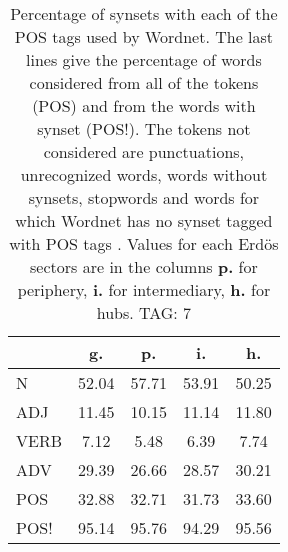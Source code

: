 \begin{table}[h!]
\begin{center}
\begin{tabular}{| l | c | c | c | c |}\hline
 & g. & p. & i. & h. \\\hline
N & 52.04  & 57.71  & 53.91  & 50.25 \\\hline
ADJ & 11.45  & 10.15  & 11.14  & 11.80 \\\hline
VERB & 7.12  & 5.48  & 6.39  & 7.74 \\\hline
ADV & 29.39  & 26.66  & 28.57  & 30.21 \\\hline
POS & 32.88  & 32.71  & 31.73  & 33.60 \\\hline
POS! & 95.14  & 95.76  & 94.29  & 95.56 \\\hline
\end{tabular}
\caption{Percentage of synsets with each of the POS tags used by Wordnet. The last lines give the percentage of words considered from all of the tokens (POS) and from the words with synset (POS!). The tokens not considered are punctuations, unrecognized words, words without synsets, stopwords and words for which Wordnet has no synset  tagged with POS tags . Values for each Erd\"os sectors are in the columns {{\bf p.}} for periphery, {{\bf i.}} for intermediary, {{\bf h.}} for hubs. TAG: 7}
\end{center}
\end{table}